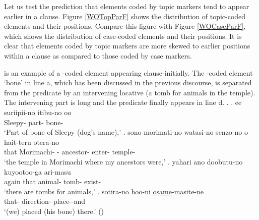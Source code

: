 Let us test the prediction that elements coded by topic markers tend to appear earlier in a clause.
Figure \ref{WOTopParF} shows the distribution of topic-coded elements
and their positions.
Compare this figure with Figure \ref{WOCaseParF},
which shows the distribution of case-coded elements and their positions.
It is clear that
elements coded by topic markers are more skewed to earlier positions within a clause as compared to those coded by case markers.

\Next is an example of a -coded element appearing clause-initially.
The -coded element  `bone' in line a,
which has been discussed in the previous discourse,
is separated from the predicate by an intervening locative (a tomb for animals in the temple).
The intervening part is long and the predicate finally appears in line d.
%
\ex.
	\ag. ee suriipii-no itibu-no oo  \\
		 Sleepy- part-  bone- \\
		`Part of bone of Sleepy (dog's name),'
	\bg. sono morimati-no watasi-no senzo-no o hait-teru otera-no \\
		that Morimachi- - ancestor-  enter- temple- \\
		`the temple in Morimachi where my ancestors were,'
	\bg. yahari ano doobutu-no kuyootoo-ga ari-masu \\
		again that animal- tomb- exist- \\
		`there are tombs for animals,'
	\bg. sotira-no hoo-ni \ul{osame}-masite-ne \\
		that- direction- place--and \\
		`(we) placed (his bone) there.'
	\hfill{()}

